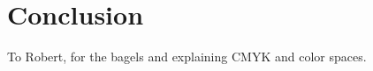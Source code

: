 \documentclass[sigconf]{acmart}
\begin{document}
\section{Conclusion}

%
\begin{acks}
To Robert, for the bagels and explaining CMYK and color spaces.
\end{acks}

%


\end{document}
